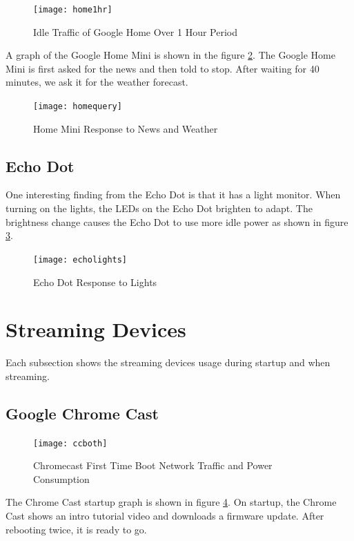 \begin{figure}[H]
  \centering
    \texttt{[image: home1hr]}
  \caption{Idle Traffic of Google Home Over 1 Hour Period}
  \label{fig:home}
\end{figure}

A graph of the Google Home Mini is shown in the figure \ref{fig:homequery}. The Google Home Mini is first asked for the news and then told to stop. After waiting for 40 minutes, we ask it for the weather forecast.

\begin{figure}[H]
  \centering
    \texttt{[image: homequery]}
  \caption{Home Mini Response to News and Weather}
  \label{fig:homequery}
\end{figure}

\subsection{Echo Dot}

One interesting finding from the Echo Dot is that it has a light monitor. When turning on the lights, the LEDs on the Echo Dot brighten to adapt. The brightness change causes the Echo Dot to use more idle power as shown in figure \ref{fig:echolights}.

\begin{figure}[H]
  \centering
    \texttt{[image: echolights]}
  \caption{Echo Dot Response to Lights}
  \label{fig:echolights}
\end{figure}

\section{Streaming Devices}
\label{Streaming Devices}

Each subsection shows the streaming devices usage during startup and when streaming.

\subsection{Google Chrome Cast}
\begin{figure}[H]
  \centering
  \texttt{[image: ccboth]}
  \caption{Chromecast First Time Boot Network Traffic and Power Consumption}
  \label{fig:ccboth}
\end{figure}

The Chrome Cast startup graph is shown in figure \ref{fig:ccboth}. On startup, the Chrome Cast shows an intro tutorial video and downloads a firmware update. After rebooting twice, it is ready to go.

